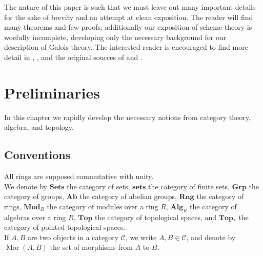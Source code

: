 \documentclass[11pt,openany]{book} %
\newcommand{\Mor}{\operatorname{Mor}}
\begin{document}
The nature of this paper is such that we must leave out many important details for the sake of brevity and an attempt at clean exposition. The reader will find many theorems and few proofs; additionally our exposition of scheme theory is woefully incomplete, developing only the necessary background for our description of Galois theory. The interested reader is encouraged to find more detail in \cite{vakil}, \cite{hartshorne}, and the original sources of \cite{grothendieckega} and \cite{grothendiecksga}.

\chapter{Preliminaries} \label{prelim}
In this chapter we rapidly develop the necessary notions from category theory, algebra, and topology. 

\section{Conventions}
All rings are supposed commutative with unity.\\

We denote by $\mathbf{Sets}$ the category of sets, $\mathbf{sets}$ the category of finite sets, $\mathbf{Grp}$ the category of groups, $\mathbf{Ab}$ the category of abelian groups, $\mathbf{Rng}$ the category of rings, $\mathbf{Mod}_R$ the category of modules over a ring $R$, $\mathbf{Alg}_R$ the category of algebras over a ring $R$, $\mathbf{Top}$ the category of topological spaces, and $\mathbf{Top}_*$ the category of pointed topological spaces.\\

If $A,B$ are two objects in a category $\mathcal{C}$, we write $A,B \in \mathcal{C}$, and denote by $\Mor(A,B)$ the set of morphisms from $A$ to $B$.

\end{document}
